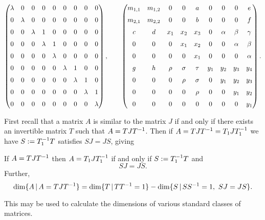 \documentclass{article}
\begin{document}


$$
\begin{pmatrix} \lambda&0&0&0&0&0&0&0&0
\\ \noalign{\medskip}0&\lambda&0&0&0&0&0&0&0\\ \noalign{\medskip}0&0&\lambda&1&0&0
&0&0&0\\ \noalign{\medskip}0&0&0&\lambda&1&0&0&0&0\\ \noalign{\medskip}0&0&0
&0&\lambda&0&0&0&0\\ \noalign{\medskip}0&0&0&0&0&\lambda&1&0&0
\\ \noalign{\medskip}0&0&0&0&0&0&\lambda&1&0\\ \noalign{\medskip}0&0&0&0&0&0
&0&\lambda&1\\ \noalign{\medskip}0&0&0&0&0&0&0&0&\lambda
\end{pmatrix},
\qquad
\begin{pmatrix}m_{{1,1}}&m_{{1,2}}&0&0&a&0&0&0&e
\\ \noalign{\medskip}m_{{2,1}}&m_{{2,2}}&0&0&b&0&0&0&f
\\ \noalign{\medskip}c&d&x_{{1}}&x_{{2}}&x_{{3}}&0&\alpha&\beta&\gamma
\\ \noalign{\medskip}0&0&0&x_{{1}}&x_{{2}}&0&0&\alpha&\beta
\\ \noalign{\medskip}0&0&0&0&x_{{1}}&0&0&0&\alpha\\ \noalign{\medskip}
g&h&\rho&\sigma&\tau&y_{{1}}&y_{{2}}&y_{{3}}&y_{{4}}
\\ \noalign{\medskip}0&0&0&\rho&\sigma&0&y_{{1}}&y_{{2}}&y_{{3}}
\\ \noalign{\medskip}0&0&0&0&\rho&0&0&y_{{1}}&y_{{2}}
\\ \noalign{\medskip}0&0&0&0&0&0&0&0&y_{{1}}
\end{pmatrix}.
$$

First recall that a matrix $A$ is similar to the matrix $J$ if and only if there exists an invertible
matrix $T$ such that $A=T J T\sp{-1}$. Then if $A=T J T\sp{-1}=T_1 J T_1\sp{-1}$ we have
$S:=T_1\sp{-1} T$ satisfies $S J=JS$, giving
\begin{lemma} If $A=T J T\sp{-1}$ then $A=T_1 J T_1\sp{-1}$ if and only if $S:=T_1\sp{-1} T$ and
	\begin{equation}
	S J=JS.
	\end{equation}
	Further,
	\begin{equation}
	\dim\{A\,|\, A=T J T\sp{-1}\}=\dim\{T\,|\, TT\sp{-1}=1\}-
	\dim\{S\,|\, SS\sp{-1}=1,\ SJ=JS\}.
	\end{equation}
\end{lemma}
This may be used 
to calculate the dimensions of various standard classes of matrices.
\end{document}
